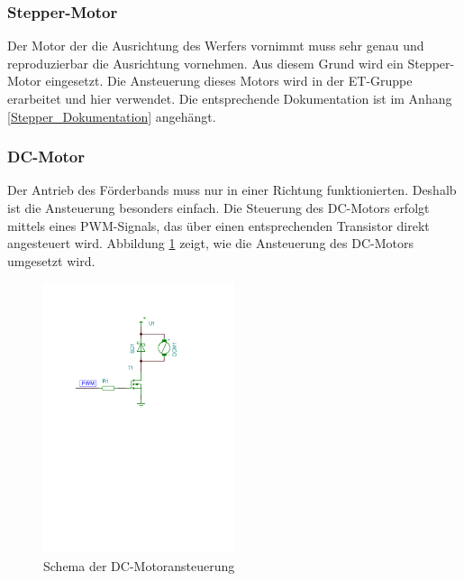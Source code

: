 \subsubsection{Stepper-Motor}
    Der Motor der die Ausrichtung des Werfers vornimmt muss sehr genau und 
    reproduzierbar die Ausrichtung vornehmen. Aus diesem Grund wird ein 
    Stepper-Motor eingesetzt. Die Ansteuerung dieses Motors wird in der 
    ET-Gruppe erarbeitet und hier verwendet. Die entsprechende Dokumentation 
    ist im Anhang \ref{Stepper_Dokumentation} angehängt.
\subsubsection{DC-Motor}
    Der Antrieb des Förderbands muss nur in einer Richtung funktionierten. 
    Deshalb ist die Ansteuerung besonders einfach. Die Steuerung des DC-Motors 
    erfolgt mittels eines PWM-Signals, das über einen entsprechenden 
    Transistor direkt angesteuert wird. Abbildung \ref{fig:Schema_DC-Motor} 
    zeigt, wie die Ansteuerung des DC-Motors umgesetzt wird.
    \begin{figure}[h!] %
    	\centering
    	\includegraphics[width=0.5\textwidth,clip,trim=37mm 159mm 62mm 37mm]
    	{Enddokumentation/Loesungskonzept/Bilder/SchemaDcMotor.pdf}
    	\caption{Schema der DC-Motoransteuerung}
    	\label{fig:Schema_DC-Motor}
    \end{figure}